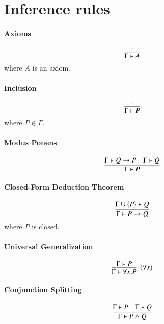 \documentclass{article}
\begin{document}
\section{Inference rules}

\paragraph{Axioms}
$$
\infer{\Gamma \vdash A}{\cdot}
$$
where $A$ is an axiom. 

\paragraph{Inclusion}
$$
\infer{\Gamma \vdash P}{\cdot}
$$
where $P \in \Gamma$.

\paragraph{Modus Ponens}
$$
\infer{\Gamma \vdash P}
      {\Gamma \vdash Q \to P
      &\Gamma \vdash Q}
$$

\paragraph{Closed-Form Deduction Theorem}
$$
\infer{\Gamma \vdash P \to Q}
{\Gamma \cup \{P\} \vdash Q}
$$
where $P$ is closed.

\paragraph{Universal Generalization}
$$
\infer[(\forall x)]{\Gamma \vdash \forall x . P}
      {\Gamma \vdash P}
$$

\paragraph{Conjunction Splitting}
$$
\infer{\Gamma \vdash P \wedge Q}
      {\Gamma \vdash P
      &\Gamma \vdash Q}
$$
\end{document}
